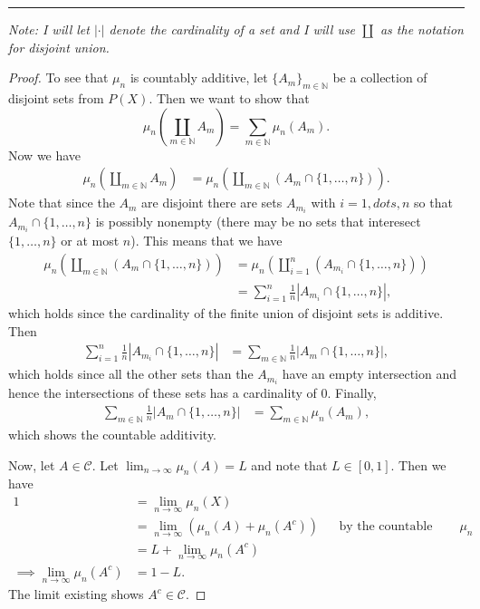 \documentclass[leqno]{article}
\theoremstyle{nonumberplain}
\newtheorem{proof}{Proof}
\newcommand{\N}{\mathbb{N}}
\begin{document}
\noindent\rule[0.5ex]{\linewidth}{1pt}

\noindent \emph{Note: I will let $|\cdot |$ denote the cardinality of a set and I will use $\coprod$ as the notation for disjoint union.}

\begin{proof}
To see that $\mu_n$ is countably additive, let $\{A_m\}_{m\in \N}$ be a collection of disjoint sets from $P(X)$. Then we want to show that
\[
\mu_n\left(\coprod_{m\in \N} A_m\right)=\sum_{m\in \N} \mu_n(A_m).
\]    
Now we have
\begin{align*}
\mu_n\left(\coprod_{m\in \N} A_m \right)&=\mu_n\left(\coprod_{m\in \N} (A_m\cap \{1,\dots,n\})\right).
\end{align*}
Note that since the $A_m$ are disjoint there are sets $A_{m_i}$ with $i=1,dots,n$ so that $A_{m_i}\cap \{1,\dots,n\}$ is possibly nonempty (there may be no sets that interesect $\{1,\dots,n\}$ or at most $n$). This means that we have
\begin{align*}
\mu_n\left(\coprod_{m\in \N} (A_m\cap \{1,\dots,n\})\right)&= \mu_n\left(\coprod_{i=1}^n (A_{m_i}\cap \{1,\dots,n\})\right)\\
&= \sum_{i=1}^n \frac{1}{n} \left| A_{m_i}\cap \{1,\dots,n\}\right| ,
\end{align*}
which holds since the cardinality of the finite union of disjoint sets is additive. Then
\begin{align*}
\sum_{i=1}^n \frac{1}{n} \left| A_{m_i}\cap \{1,\dots,n\}\right|&=\sum_{m\in \N}\frac{1}{n}\left| A_m \cap \{1,\dots,n\}\right|,
\end{align*}
which holds since all the other sets than the $A_{m_i}$ have an empty intersection and hence the intersections of these sets has a cardinality of $0$. Finally,
\begin{align*}
\sum_{m\in \N}\frac{1}{n}\left| A_m \cap \{1,\dots,n\}\right|&=\sum_{m\in \N}\mu_n (A_m),
\end{align*}
which shows the countable additivity.

Now, let $A\in \mathcal{C}$.  Let $\lim_{n\to \infty}\mu_n(A)=L$ and note that $L\in [0,1]$.  Then we have
\begin{align*}
1&=\lim_{n\to \infty}\mu_n (X)\\
&=\lim_{n\to \infty} (\mu_n(A)+\mu_n(A^c)) && \textrm{by the countable (and hence finite) additivity of $\mu_n$}\\
&=L+\lim_{n\to \infty} \mu_n(A^c)\\
\implies \lim_{n\to \infty} \mu_n(A^c)&=1-L.
\end{align*}
The limit existing shows $A^c\in \mathcal{C}$.


\end{proof}
\end{document}
